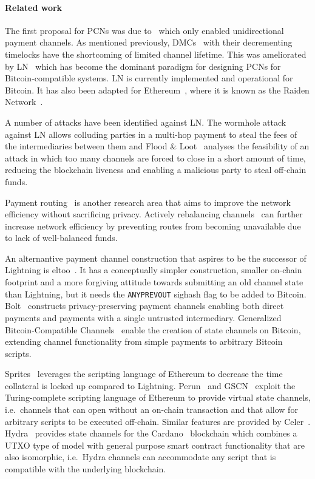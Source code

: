 \paragraph{Related work}
 The first proposal for PCNs was due to~\cite{spilman} which only enabled
 unidirectional payment channels. As mentioned previously, DMCs~\cite{decker}
 with their decrementing timelocks have the shortcoming of limited channel
 lifetime. This was ameliorated by LN~\cite{lightning} which has become the dominant paradigm for designing PCNs for Bitcoin-compatible systems. 
 LN is currently implemented and operational for
  Bitcoin. It has also been adapted for Ethereum~\cite{wood2014ethereum}, where
  it is known as the Raiden Network~\cite{raiden}.

A number of attacks have been identified against LN. The wormhole
  attack~\cite{DBLP:conf/ndss/MalavoltaMSKM19} against LN allows
  colluding parties in a multi-hop payment to steal the fees of the
  intermediaries between them and Flood \& Loot~\cite{10.1145/3419614.3423248}
  analyses the feasibility of an attack in which too many channels are forced to
  close in a short amount of time, reducing the blockchain liveness and enabling
  a malicious party to steal off-chain funds.

  Payment routing~\cite{spider,prihodko2016flare,lee2020routee} is another research area that aims to improve the network efficiency without sacrificing  privacy. Actively rebalancing channels~\cite{DBLP:conf/ccs/KhalilG17} can
  further increase network efficiency by preventing routes from becoming   unavailable due to lack of well-balanced funds.

  An alternantive payment channel construction that aspires to be the successor
  of Lightning is eltoo~\cite{eltoo}. It has a conceptually simpler
  construction, smaller on-chain footprint and a more forgiving attitude towards
  submitting an old channel state than Lightning, but it needs the
  \texttt{ANYPREVOUT} sighash flag to be added to Bitcoin.
  Bolt~\cite{10.1145/3133956.3134093} constructs privacy-preserving payment
  channels enabling both direct payments and payments with a single untrusted
  intermediary. Generalized Bitcoin-Compatible
  Channels~\cite{cryptoeprint:2020:476} enable the creation of state channels on
  Bitcoin, extending channel functionality from simple payments to arbitrary
  Bitcoin scripts.

  Sprites~\cite{sprites} leverages the scripting language of Ethereum to
  decrease the time collateral is locked up compared to Lightning.
  Perun~\cite{perun} and GSCN~\cite{DBLP:conf/ccs/DziembowskiFH18} exploit the
  Turing-complete scripting language of Ethereum to provide virtual state
  channels, i.e.\ channels that can open without an on-chain transaction and that
  allow for arbitrary scripts to be executed off-chain. Similar features are
  provided by Celer~\cite{dong2018celer}. Hydra~\cite{cryptoeprint:2020:299}
  provides state channels for the Cardano~\cite{cardano} blockchain which
  combines a UTXO type of model with general purpose smart contract
  functionality that are also isomorphic, i.e.\ Hydra channels can accommodate
  any script that is compatible with the underlying blockchain.

